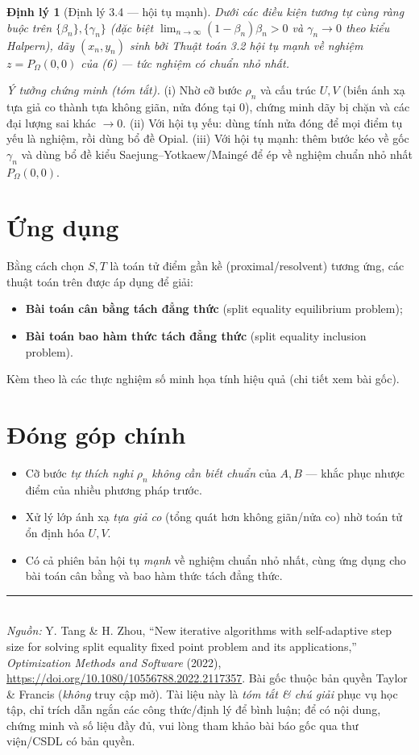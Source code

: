\documentclass{MyBook}
\theoremstyle{plain}
\newtheorem{theorem}{Định lý}
\theoremstyle{definition}
\begin{document}
\begin{theorem}[Định lý 3.4 --- hội tụ mạnh]
Dưới các điều kiện tương tự cùng ràng buộc trên $\{\beta_n\},\{\gamma_n\}$ (đặc biệt $\lim_{n\to\infty}(1-\beta_n)\beta_n>0$ và $\gamma_n\to0$ theo kiểu Halpern), dãy $(x_n,y_n)$ sinh bởi Thuật toán 3.2 hội tụ \emph{mạnh} về nghiệm $z=P_{\Omega}(0,0)$ của (6) --- tức nghiệm có \emph{chuẩn nhỏ nhất}.
\end{theorem}

\noindent\emph{Ý tưởng chứng minh (tóm tắt).} (i) Nhờ cỡ bước $\rho_n$ và cấu trúc $U,V$ (biến ánh xạ tựa giả co thành tựa không giãn, nửa đóng tại 0), chứng minh dãy bị chặn và các đại lượng sai khác $\to0$. (ii) Với hội tụ yếu: dùng tính nửa đóng để mọi điểm tụ yếu là nghiệm, rồi dùng bổ đề Opial. (iii) Với hội tụ mạnh: thêm bước kéo về gốc $\gamma_n$ và dùng bổ đề kiểu Saejung--Yotkaew/Maingé để ép về nghiệm chuẩn nhỏ nhất $P_{\Omega}(0,0)$.

\chapter{Ứng dụng}

Bằng cách chọn $S,T$ là toán tử điểm gần kề (proximal/resolvent) tương ứng, các thuật toán trên được áp dụng để giải:
\begin{itemize}[leftmargin=1.4em,itemsep=1pt]
\item \textbf{Bài toán cân bằng tách đẳng thức} (split equality equilibrium problem);
\item \textbf{Bài toán bao hàm thức tách đẳng thức} (split equality inclusion problem).
\end{itemize}
Kèm theo là các thực nghiệm số minh họa tính hiệu quả (chi tiết xem bài gốc).

\chapter{Đóng góp chính}
\begin{itemize}[leftmargin=1.4em,itemsep=1pt]
\item Cỡ bước \emph{tự thích nghi} $\rho_n$ \emph{không cần biết chuẩn} của $A,B$ --- khắc phục nhược điểm của nhiều phương pháp trước.
\item Xử lý lớp ánh xạ \emph{tựa giả co} (tổng quát hơn không giãn/nửa co) nhờ toán tử ổn định hóa $U,V$.
\item Có cả phiên bản hội tụ \emph{mạnh} về nghiệm chuẩn nhỏ nhất, cùng ứng dụng cho bài toán cân bằng và bao hàm thức tách đẳng thức.
\end{itemize}

\vfill
\noindent\rule{\linewidth}{0.4pt}\\[2pt]
{\footnotesize\textit{Nguồn:} Y. Tang \& H. Zhou, ``New iterative algorithms with self-adaptive step size for solving split equality fixed point problem and its applications,'' \textit{Optimization Methods and Software} (2022), \url{https://doi.org/10.1080/10556788.2022.2117357}. Bài gốc thuộc bản quyền Taylor \& Francis (\emph{không} truy cập mở). Tài liệu này là \emph{tóm tắt \& chú giải} phục vụ học tập, chỉ trích dẫn ngắn các công thức/định lý để bình luận; để có nội dung, chứng minh và số liệu đầy đủ, vui lòng tham khảo bài báo gốc qua thư viện/CSDL có bản quyền.}
\end{document}
